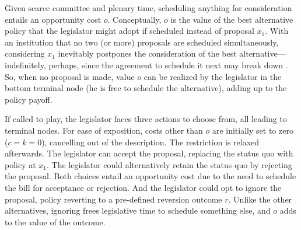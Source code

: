 \documentclass[letter,12pt]{article}
\begin{document}
Given scarce committee and plenary time, scheduling anything for consideration entails an opportunity cost $o$. Conceptually, $o$ is the value of the best alternative policy that the legislator might adopt if scheduled instead of proposal $x_1$. With an institution that no two (or more) proposals are scheduled simultaneously, considering $x_1$ inevitably postpones the consideration of the best alternative---indefinitely, perhaps, since the agreement to schedule it next may break down \citep{cameron.2000,wawro.schickler.filibuster.2007}. So, when no proposal is made, value $o$ can be realized by the legislator in the bottom terminal node (he is free to schedule the alternative), adding up to the policy payoff. 

If called to play, the legislator faces three actions to choose from, all leading to terminal nodes. For ease of exposition, costs other than $o$ are initially set to zero ($c = k = 0$), cancelling out of the description. The restriction is relaxed afterwards. The legislator can accept the proposal, replacing the status quo with policy at $x_1$. The legislator could alternatively retain the status quo by rejecting the proposal. Both choices entail an opportunity cost due to the need to schedule the bill for acceptance or rejection. And the legislator could opt to ignore the proposal, policy reverting to a pre-defined reversion outcome $r$. Unlike the other alternatives, ignoring frees legislative time to schedule something else, and $o$ adds to the value of the outcome. 

%
%
%
%
\end{document}
